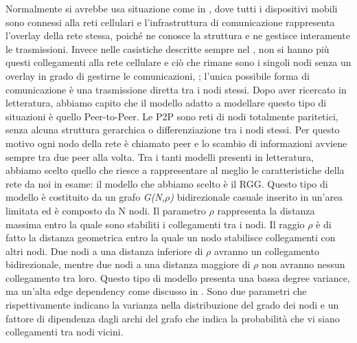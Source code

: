 Normalmente si avrebbe usa situazione come in , dove tutti i dispositivi mobili sono connessi alla reti cellulari e l'infrastruttura di comunicazione rappresenta l'overlay della rete stessa, poiché ne conosce la struttura e ne gestisce interamente le trasmissioni. Invece nelle casistiche descritte sempre nel , non si hanno più questi collegamenti alla rete cellulare e ciò che rimane sono i singoli nodi senza un overlay in grado di gestirne le comunicazioni, ; l'unica possibile forma di comunicazione è una trasmissione diretta tra i nodi stessi. Dopo aver ricercato in letteratura, abbiamo capito che il modello adatto a modellare questo tipo di situazioni è quello Peer-to-Peer. Le \acs{P2P} sono reti di nodi totalmente paritetici, senza alcuna struttura gerarchica o differenziazione tra i nodi stessi. Per questo motivo ogni nodo della rete è chiamato peer e lo scambio di informazioni avviene sempre tra due peer alla volta. Tra i tanti modelli presenti in letteratura, abbiamo scelto quello che riesce a rappresentare al meglio le caratteristiche della rete da noi in esame: il modello che abbiamo scelto è il \acf{RGG}. Questo tipo di modello è costituito da un grafo \textit{G(N,$\rho$)} bidirezionale casuale inserito in un'area limitata ed è composto da N nodi. Il parametro $\rho$ rappresenta la distanza massima entro la quale sono stabiliti i collegamenti tra i nodi. Il raggio $\rho$ è di fatto la distanza geometrica entro la quale un nodo stabilisce collegamenti con altri nodi. Due nodi a una distanza inferiore di $\rho$ avranno un collegamento bidirezionale, mentre due nodi a una distanza maggiore di $\rho$ non avranno nessun collegamento tra loro. Questo tipo di modello presenta una bassa degree variance, ma un'alta edge dependency come discusso in . Sono due parametri che rispettivamente indicano la varianza nella distribuzione del grado dei nodi e un fattore di dipendenza dagli archi del grafo che indica la probabilità che vi siano collegamenti tra nodi vicini.

